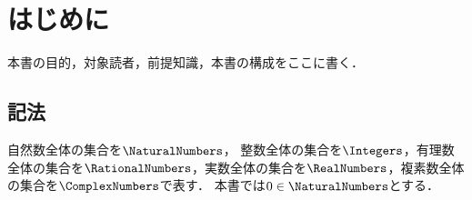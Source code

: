 \chapter{はじめに}

本書の目的，対象読者，前提知識，本書の構成をここに書く．

\section*{記法}

自然数全体の集合を\(\NaturalNumbers\)，%
%
%
%
%
%
整数全体の集合を\(\Integers\)，有理数全体の集合を\(\RationalNumbers\)，実数全体の集合を\(\RealNumbers\)，複素数全体の集合を\(\ComplexNumbers\)で表す．
本書では\(0 \in \NaturalNumbers\)とする．
